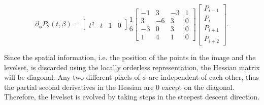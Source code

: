 \begin{equation}
\partial_\phi  P_2(t,\beta) = 
  \begin{bmatrix} t^2 & t & 1 & 0 \end{bmatrix} 
  \frac{1}{6} 
  \begin{bmatrix}
    -1 &  3 & -3 & 1 \\
    3 & -6 &  3 & 0 \\
    -3 &  0 &  3 & 0 \\
    1 &  4 &  1 & 0 
  \end{bmatrix}
  \left[\begin{array}{l} 
      P_{i-1} \\
      P_{i} \\
      P_{i+1} \\
      P_{i+2}
    \end{array}\right].
\end{equation}

Since the spatial information, i.e. the position of the points in the image and the levelset, is discarded using the locally orderless representation, the Hessian matrix will be diagonal. Any two different pixels of $\phi$ are independent of each other, thus the partial second derivatives in the Hessian are 0 except on the diagonal. Therefore, the levelset is evolved by taking steps in the steepest descent direction.